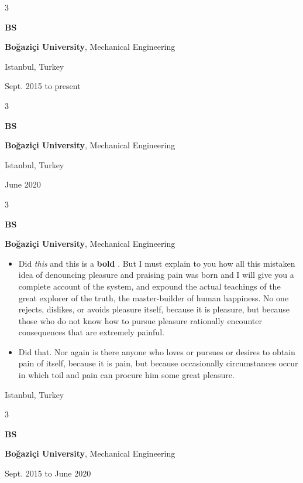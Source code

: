 \documentclass[10pt, letterpaper]{article}
\newenvironment{highlights}{
    \begin{itemize}[
        topsep=0.10 cm,
        parsep=0.10 cm,
        partopsep=0pt,
        itemsep=0pt,
        leftmargin=0.4 cm + 10pt
    ]
}{
    \end{itemize}
} %
\newenvironment{threecolentry}[3][]{
    \onecolentry
    \def\thirdColumn{#3}
    \setcolumnwidth{1 cm, \fill, 4.5 cm}
    \begin{paracol}{3}
    {\raggedright #2} \switchcolumn
}{
    \switchcolumn \raggedleft \thirdColumn
    \end{paracol}
    \endonecolentry
} %
\let\hrefWithoutArrow\href
\renewcommand{\href}[2]{\hrefWithoutArrow{#1}{\mbox{\ifthenelse{\equal{#2}{}}{ }{#2 }\raisebox{.15ex}{\footnotesize \faExternalLink*}}}}
\begin{document}
        \vspace{0.2 cm}

        \begin{threecolentry}{\textbf{BS}}{
            Istanbul, Turkey

        Sept. 2015 to present
        }
            \textbf{Boğaziçi University}, Mechanical Engineering
        \end{threecolentry}

        \vspace{0.2 cm}

        \begin{threecolentry}{\textbf{BS}}{
            Istanbul, Turkey

        June 2020
        }
            \textbf{Boğaziçi University}, Mechanical Engineering
        \end{threecolentry}

        \vspace{0.2 cm}

        \begin{threecolentry}{\textbf{BS}}{
            Istanbul, Turkey
        }
            \textbf{Boğaziçi University}, Mechanical Engineering
            \begin{highlights}
                \item Did \textit{this} and this is a \textbf{bold} \href{https://example.com}{link}. But I must explain to you how all this mistaken idea of denouncing pleasure and praising pain was born and I will give you a complete account of the system, and expound the actual teachings of the great explorer of the truth, the master-builder of human happiness. No one rejects, dislikes, or avoids pleasure itself, because it is pleasure, but because those who do not know how to pursue pleasure rationally encounter consequences that are extremely painful.
                \item Did that. Nor again is there anyone who loves or pursues or desires to obtain pain of itself, because it is pain, but because occasionally circumstances occur in which toil and pain can procure him some great pleasure.
            \end{highlights}
        \end{threecolentry}

        \vspace{0.2 cm}

        \begin{threecolentry}{\textbf{BS}}{
            Sept. 2015 to June 2020
        }
            \textbf{Boğaziçi University}, Mechanical Engineering
        \end{threecolentry}
\end{document}
